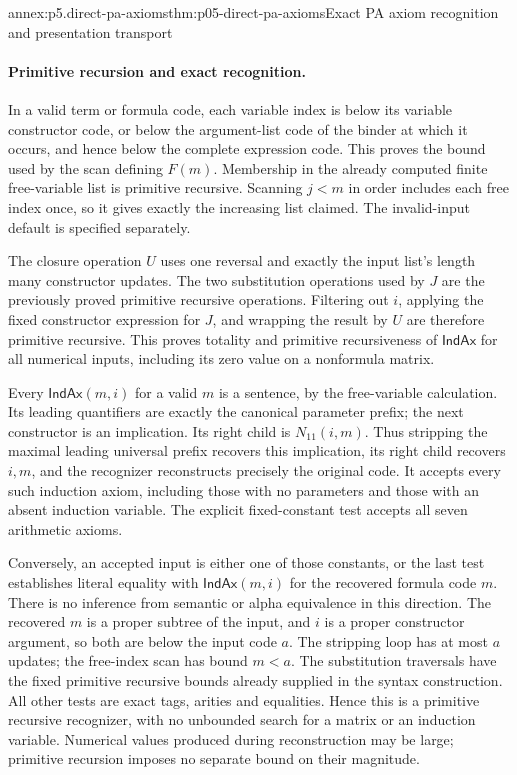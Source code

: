 \begin{annexitem}{annex:p5.direct-pa-axioms}{thm:p05-direct-pa-axioms}{Exact PA axiom recognition and presentation transport}
\paragraph{Primitive recursion and exact recognition.}
In a valid term or formula code, each variable index is below its variable
constructor code, or below the argument-list code of the binder at which
it occurs, and hence below the complete expression code.  This proves
the bound used by the scan defining \(F(m)\).  Membership in the already
computed finite free-variable list is primitive recursive.  Scanning
\(j<m\) in order includes each free index once, so it gives exactly the
increasing list claimed.  The invalid-input default is specified separately.

The closure operation \(U\) uses one reversal and exactly the input list's
length many constructor updates.  The two substitution operations used by
\(J\) are the previously proved primitive recursive operations.  Filtering
out \(i\), applying the fixed constructor expression for \(J\), and
wrapping the result by \(U\) are therefore primitive recursive.  This
proves totality and primitive recursiveness of \(\mathsf{IndAx}\) for
all numerical inputs, including its zero value on a nonformula matrix.

Every \(\mathsf{IndAx}(m,i)\) for a valid \(m\) is a sentence, by
the free-variable calculation.  Its leading quantifiers are exactly the
canonical parameter prefix; the next constructor is an implication.
Its right child is \(N_{11}(i,m)\).  Thus stripping the maximal leading
universal prefix recovers this implication, its right child recovers
\(i,m\), and the recognizer reconstructs precisely the original code.
It accepts every such induction axiom, including those with no parameters
and those with an absent induction variable.  The explicit fixed-constant
test accepts all seven arithmetic axioms.

Conversely, an accepted input is either one of those constants, or the
last test establishes literal equality with
\(\mathsf{IndAx}(m,i)\) for the recovered formula code \(m\).
There is no inference from semantic or alpha equivalence in this direction.
The recovered \(m\) is a proper subtree of the input, and \(i\) is a
proper constructor argument, so both are below the input code \(a\).
The stripping loop has at most \(a\) updates; the free-index scan has
bound \(m<a\).  The substitution traversals have the fixed primitive
recursive bounds already supplied in the syntax construction.  All other
tests are exact tags, arities and equalities.  Hence this is a primitive
recursive recognizer, with no unbounded search for a matrix or an induction
variable.  Numerical values produced during reconstruction may be large;
primitive recursion imposes no separate bound on their magnitude.


\end{annexitem}

